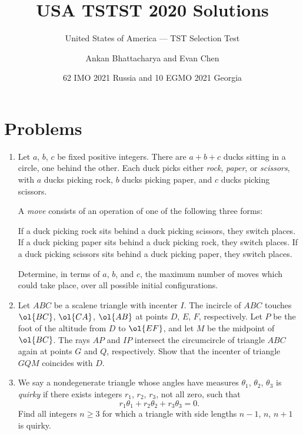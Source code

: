 \documentclass[11pt]{scrartcl}
\begin{document}
\title{USA TSTST 2020 Solutions}
\subtitle{United States of America --- TST Selection Test}
\author{Ankan Bhattacharya and Evan Chen}
\date{62 IMO 2021 Russia and 10 EGMO 2021 Georgia}

\maketitle

\tableofcontents
\newpage

\addtocounter{section}{-1}
\section{Problems}
\begin{enumerate}[\bfseries 1.]
\item %
Let $a$, $b$, $c$ be fixed positive integers.
There are $a+b+c$ ducks sitting in a circle, one behind the other.
Each duck picks either \emph{rock}, \emph{paper}, or \emph{scissors},
with $a$ ducks picking rock, $b$ ducks picking paper,
and $c$ ducks picking scissors.

A \emph{move} consists of an operation of one of the following three forms:
\begin{itemize}
  \ii If a duck picking rock sits behind a duck
  picking scissors, they switch places.
  \ii If a duck picking paper sits behind a duck
  picking rock, they switch places.
  \ii If a duck picking scissors sits behind a duck
  picking paper, they switch places.
\end{itemize}
Determine, in terms of $a$, $b$, and $c$,
the maximum number of moves which could take place,
over all possible initial configurations.

\item %
Let $ABC$ be a scalene triangle with incenter $I$.
The incircle of $ABC$ touches $\ol{BC}$, $\ol{CA}$, $\ol{AB}$
at points $D$, $E$, $F$, respectively.
Let $P$ be the foot of the altitude from $D$ to $\ol{EF}$,
and let $M$ be the midpoint of $\ol{BC}$.
The rays $AP$ and $IP$ intersect the circumcircle
of triangle $ABC$ again at points $G$ and $Q$, respectively.
Show that the incenter of triangle $GQM$ coincides with $D$.

\item %
We say a nondegenerate triangle whose angles have
measures $\theta_1$, $\theta_2$, $\theta_3$ is \emph{quirky}
if there exists integers $r_1$, $r_2$, $r_3$, not all zero,
such that \[ r_1 \theta_1 + r_2 \theta_2 + r_3 \theta_3 = 0. \]
Find all integers $n \ge 3$ for which a triangle with
side lengths $n-1$, $n$, $n+1$ is quirky.


\end{enumerate}
\end{document}
